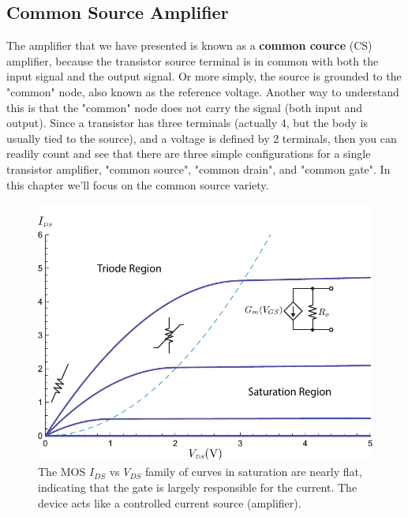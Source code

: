 \subsection{Common Source Amplifier}
The amplifier that we have presented is known as a \textbf{common cource} (CS) amplifier, because the transistor source terminal is in common with both the input signal and the output signal.  Or more simply, the source is grounded to the "common" node, also known as the reference voltage.  Another way to understand this is that the "common" node does not carry the signal (both input and output).  Since a transistor has three terminals (actually 4, but the body is usually tied to the source), and a voltage is defined by 2 terminals, then you can readily count and see that there are three simple configurations for a single transistor amplifier, "common source", "common drain", and "common gate".  In this chapter we'll focus on the common source variety.
\newpage
\begin{figure}[t]
\centering
\includegraphics[width=.9\columnwidth]{mos_building_block}
\caption{The MOS $I_{DS}$ vs $V_{DS}$ family of curves in saturation are nearly flat, indicating that the gate is largely responsible for the current.  The device acts like a controlled current source (amplifier).}
\label{fig:mos_building_block}
\end{figure}
